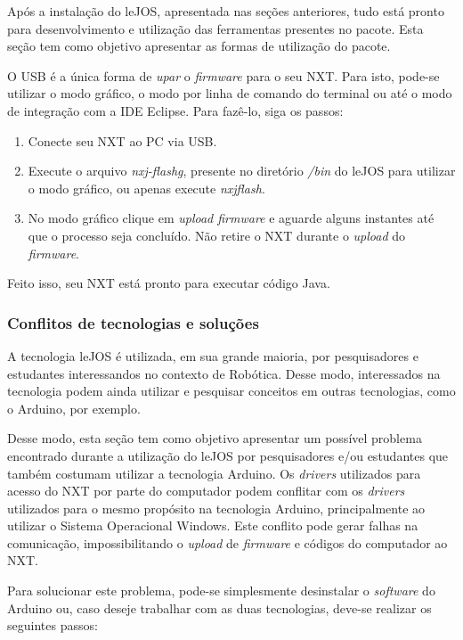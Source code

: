 	Após a instalação do leJOS, apresentada nas seções anteriores, tudo está pronto para desenvolvimento e utilização das ferramentas presentes no pacote. Esta seção tem como objetivo apresentar as formas de utilização do pacote.

	O USB é a única forma de \textit{upar} o \textit{firmware} para o seu NXT. Para isto, pode-se utilizar o modo gráfico, o modo por linha de comando do terminal ou até o modo de integração com a IDE Eclipse. Para fazê-lo, siga os passos:

	\begin{enumerate}
		\item Conecte seu NXT ao PC via USB.
		\item Execute o arquivo \textit{nxj-flashg}, presente no diretório \textit{/bin} do leJOS para utilizar o modo gráfico, ou apenas execute \textit{nxjflash}.
		\item No modo gráfico clique em \textit{upload firmware} e aguarde alguns instantes até que o processo seja concluído. Não retire o NXT durante o \textit{upload} do \textit{firmware}.
	\end{enumerate}

	Feito isso, seu NXT está pronto para executar código Java.

\subsubsection{Conflitos de tecnologias e soluções}

A tecnologia leJOS é utilizada, em sua grande maioria, por pesquisadores e estudantes interessandos no contexto de Robótica. Desse modo, interessados na tecnologia
podem ainda utilizar e pesquisar conceitos em outras tecnologias, como o Arduino, por exemplo.

Desse modo, esta seção tem como objetivo apresentar um possível problema encontrado durante a utilização do leJOS por pesquisadores e/ou estudantes que também
costumam utilizar a tecnologia Arduino. Os \textit{drivers} utilizados para acesso do NXT por parte do computador podem conflitar com os \textit{drivers} utilizados
para o mesmo propósito na tecnologia Arduino, principalmente ao utilizar o Sistema Operacional Windows. Este conflito pode gerar falhas na comunicação, impossibilitando
o \textit{upload} de \textit{firmware} e códigos do computador ao NXT.

Para solucionar este problema, pode-se simplesmente desinstalar o \textit{software} do Arduino ou, caso deseje trabalhar com as duas tecnologias, deve-se realizar os seguintes passos:


